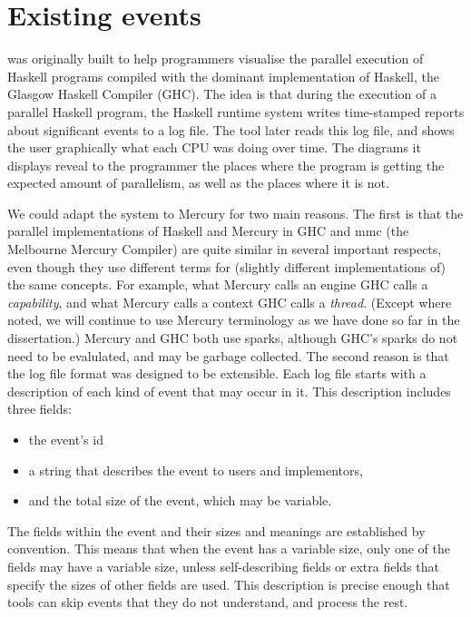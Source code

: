 
\section{Existing \tscope events}
\label{sec:tscope_background}

\tscope was originally built
to help programmers visualise the parallel execution of Haskell programs
compiled with the dominant implementation of Haskell,
the Glasgow Haskell Compiler (GHC).
The idea is that during the execution of a parallel Haskell program,
the Haskell runtime system writes time-stamped reports
about significant events to a log file.
The \tscope tool later reads this log file,
and shows the user graphically what each CPU was doing over time.
The diagrams it displays reveal to the programmer
the places where the program is getting the expected amount of parallelism,
as well as the places where it is not.

We could adapt the \tscope system to Mercury for two main reasons.
The first is that the parallel implementations of Haskell and Mercury
in GHC and mmc (the Melbourne Mercury Compiler)
are quite similar in several important respects,
even though they use different terms for
(slightly different implementations of) the same concepts.
For example, what Mercury calls an engine GHC calls a \emph{capability},
and what Mercury calls a context GHC calls a \emph{thread}.
(Except where noted,
we will continue to use Mercury terminology as we have done so far in the
dissertation.)
Mercury and GHC both use sparks,
although GHC's sparks do not need to be evalulated,
and may be garbage collected.
The second reason is that
the \tscope log file format was designed to be extensible.
Each log file starts with a description
of each kind of event that may occur in it.
This description includes three fields:
\begin{itemize}
\item the event's id
\item a string that describes the event to users and implementors,
\item and the total size of the event,
which may be variable.
\end{itemize}
The fields within the event and their sizes and meanings are established by
convention.
This means that when the event has a variable size,
only one of the fields may have a variable size,
unless self-describing fields or extra fields that specify the sizes of
other fields are used.
This description is precise enough that tools
can skip events that they do not understand,
and process the rest.

